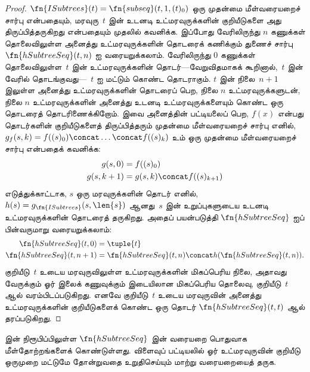 \documentclass[../../../include/open-logic-section]{subfiles}
\begin{document}
\begin{proof}
  $\fn{ISubtrees}(t) = \fn{subseq}(t, 1, (t)_0)$ ஒரு முதன்மை
  மீள்வரையறைச் சார்பு என்பதையும், மரவுரு~$t$ இன் உடனடி
  உட்மரவுருக்களின் குறியீடுகளை அது திருப்பித்தருகிறது என்பதையும்
  முதலில் கவனிக்க. இப்போது வேரிலிருந்து $n$ கணுக்கள் தொலைவிலுள்ள
  அனைத்து உட்மரவுருக்களின் தொடரைக் கணிக்கும் துணைச் சார்பு
  $\fn{hSubtreeSeq}(t,n)$ ஐ வரையறுக்கலாம். வேரிலிருந்து $0$
  கணுக்கள் தொலைவிலுள்ள~$t$ இன் உட்மரவுருக்களின் தொடர்---வேறுவிதமாகக்
  கூறினால்,~$t$ இன் வேரில் தொடங்குவது---~$t$ ஐ மட்டும் கொண்ட
  தொடராகும். $t$ இன் நிலை~$n+1$ இலுள்ள அனைத்து
  உட்மரவுருக்களின் தொடரைப் பெற, நிலை $n$ உட்மரவுருக்களுடன்,
  நிலை $n$ உட்மரவுருக்களின் அனைத்து உடனடி உட்மரவுருக்களையும் கொண்ட
  ஒரு தொடரைத் தொடரிணைக்கிறோம். இவை அனைத்தின் பட்டியலைப் பெற,
  $f(x)$ என்பது
  தொடர்களின் குறியீடுகளைத் திருப்பித்தரும் முதன்மை மீள்வரையறைச்
  சார்பு எனில், $g_f(s, k) = f((s)_0) \concat \dots \concat
  f((s)_k)$ உம் ஒரு முதன்மை மீள்வரையறைச் சார்பு என்பதைக் கவனிக்க:
    \begin{align*}
      g(s, 0) & = f((s)_0)\\
      g(s, k+1) & = g(s, k) \concat f((s)_{k+1})
    \end{align*}
    எடுத்துக்காட்டாக, $s$ ஒரு மரவுருக்களின் தொடர் எனில்,
    $h(s) = g_{\fn{ISubtrees}}(s, \len{s})$ ஆனது~$s$ இன்
    உறுப்புகளுடைய உடனடி உட்மரவுருக்களின் தொடரைத் தருகிறது. அதைப்
    பயன்படுத்தி $\fn{hSubtreeSeq}$ ஐப் பின்வருமாறு வரையறுக்கலாம்:
    \begin{align*}
      \fn{hSubtreeSeq}(t, 0) & = \tuple{t} \\
      \fn{hSubtreeSeq}(t, n+1) & = \fn{hSubtreeSeq}(t, n) \concat
      h(\fn{hSubtreeSeq}(t, n)).
    \end{align*}
    குறியீடு~$t$ உடைய மரவுருவிலுள்ள உட்மரவுருக்களின் மிகப்பெரிய
    நிலை, அதாவது வேருக்கும் ஓர் இலைக் கணுவுக்கும் இடையிலான
    மிகப்பெரிய தொலைவு, குறியீடு~$t$ ஆல் வரம்பிடப்படுகிறது.
    எனவே குறியீடு~$t$ உடைய மரவுருவின் அனைத்து உட்மரவுருக்களின்
    குறியீடுகளைக் கொண்ட ஒரு தொடர் $\fn{hSubtreeSeq}(t, t)$ ஆல்
    தரப்படுகிறது.
\end{proof}

\begin{prob}
   இன் நிரூபிப்பிலுள்ள
  $\fn{hSubtreeSeq}$ இன் வரையறை பொதுவாக மீள்தோற்றங்களைக் கொண்டுள்ளது.
  விளைவுப் பட்டியலில் ஓர் உட்மரவுருவின் குறியீடு ஒருமுறை மட்டுமே
  தோன்றுவதை உறுதிசெய்யும் மாற்று வரையறையைத் தருக.
\end{prob}
\end{document}
